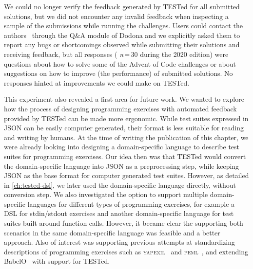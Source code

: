 \documentclass[../main]{subfiles}
\begin{document}
We could no longer verify the feedback generated by TESTed for all submitted solutions, but we did not encounter any invalid feedback when inspecting a sample of the submissions while running the challenges.
Users could contact the authors~\autocite{strijbolTESTedEducationalTesting2023} through the Q\&A module of Dodona and we explicitly asked them to report any bugs or shortcomings observed while submitting their solutions and receiving feedback, but all responses ({ \textit{n}\,=\,30} during the 2020 edition) were questions about how to solve some of the Advent of Code challenges or about suggestions on how to improve (the performance) of submitted solutions.
No responses hinted at improvements we could make on TESTed.

This experiment also revealed a first area for future work.
We wanted to explore how the process of designing programming exercises with automated feedback provided by TESTed can be made more ergonomic.
While test suites expressed in JSON can be easily computer generated, their format is less suitable for reading and writing by humans.
At the time of writing the publication of this chapter, we were already looking into designing a domain-specific language to describe test suites for programming exercises.
Our idea then was that TESTed would convert the domain-specific language into JSON as a preprocessing step, while keeping JSON as the base format for computer generated test suites.
However, as detailed in \cref{ch:tested-dsl}, we later used the domain-specific language directly, without conversion step.
We also investigated the option to support multiple domain-specific languages for different types of programming exercises, for example a DSL for stdin/stdout exercises and another domain-specific language for test suites built around function calls.
However, it became clear the supporting both scenarios in the same domain-specific language was feasible and a better approach.
Also of interest was supporting previous attempts at standardizing descriptions of programming exercises such as \textsc{yape}x\textsc{il}~\autocite{paivaAnotherProgrammingExercises2020} and \textsc{peml}~\autocite{mishraProgrammingExerciseMarkup2023}, and extending BabelO~\autocite{queirosBabeLOExtensibleConverter2013} with support for TESTed.
\end{document}
